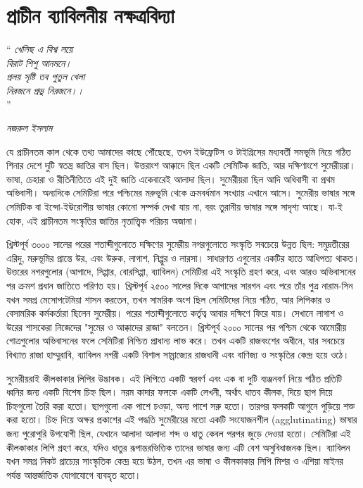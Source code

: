 

\chapter{প্রাচীন ব্যাবিলনীয় নক্ষত্রবিদ্যা}
\epigraph{``\textit{
খেলিছ এ বিশ্ব লয়ে \\
বিরাট শিশু আনমনে। \\
প্রলয় সৃষ্টি তব পুতুল খেলা \\
নিরজনে প্রভু নিরজনে।। \\
}''}{\textit{নজরুল ইসলাম}}

যে প্রাচীনতম কাল থেকে তথ্য আমাদের কাছে পৌঁছেছে, তখন ইউফ্রেটিস ও টাইগ্রিসের মধ্যবর্তী সমভূমি নিয়ে গঠিত শিনার দেশে দুটি স্বতন্ত্র জাতির বাস ছিল। উত্তরাংশ আক্কাদে ছিল একটি সেমিটিক জাতি, আর দক্ষিণাংশে সুমেরীয়রা। ভাষা, চেহারা ও রীতিনীতিতে এই দুই জাতি একেবারেই আলাদা ছিল। সুমেরীয়রা ছিল আদি অধিবাসী বা প্রথম অভিবাসী। অন্যদিকে সেমিটিরা পরে পশ্চিমের মরুভূমি থেকে ক্রমবর্ধমান সংখ্যায় এখানে আসে। সুমেরীয় ভাষার সঙ্গে সেমিটিক বা ইন্দো-ইউরোপীয় ভাষার কোনো সম্পর্ক দেখা যায় না, বরং তুরানীয় ভাষার সঙ্গে সাদৃশ্য আছে। যা-ই হোক, এই প্রাচীনতম সংস্কৃতির জাতির নৃতাত্ত্বিক পরিচয় অজানা।

খ্রিস্টপূর্ব ৩০০০ সালের পরের শতাব্দীগুলোতে দক্ষিণের সুমেরীয় নগরগুলোতে সংস্কৃতি সবচেয়ে উন্নত ছিল: সমুদ্রতীরের এরিদু, মরুভূমির প্রান্তে উর, এবং উরুক, লাগাশ, নিপ্পুর ও লারসা। সাধারণত এগুলোর একটির হাতে আধিপত্য থাকত। উত্তরের নগরগুলোর (আগাদে, সিপ্পার, বোরসিপ্পা, ব্যাবিলন) সেমিটিরা এই সংস্কৃতি গ্রহণ করে, এবং আরও অভিবাসনের পর ক্রমশ প্রধান জাতিতে পরিণত হয়। খ্রিস্টপূর্ব ২৫০০ সালের দিকে আগাদের সারগন এবং পরে তাঁর পুত্র নারাম-সিন যখন সমগ্র মেসোপটেমিয়া শাসন করতেন, তখন সামরিক অংশ ছিল সেমিটিদের নিয়ে গঠিত, আর লিপিকার ও বেসামরিক কর্মকর্তারা ছিলেন সুমেরীয়। পরের শতাব্দীগুলোতে কর্তৃত্ব আবার দক্ষিণে ফিরে যায়। সেখানে লাগাশ ও উরের শাসকেরা নিজেদের "সুমের ও আক্কাদের রাজা" বলতেন। খ্রিস্টপূর্ব ২০০০ সালের পর পশ্চিম থেকে আমোরীয় গোত্রগুলোর অভিবাসনের ফলে সেমিটিরা নিশ্চিত প্রাধান্য লাভ করে। তখন একটি রাজবংশের অধীনে, যার সবচেয়ে বিখ্যাত রাজা হাম্মুরাবি, ব্যাবিলন নগরী একটি বিশাল সাম্রাজ্যের রাজধানী এবং বাণিজ্য ও সংস্কৃতির কেন্দ্র হয়ে ওঠে।

সুমেরীয়রাই কীলকাকার লিপির উদ্ভাবক। এই লিপিতে একটি স্বরবর্ণ এবং এক বা দুটি ব্যঞ্জনবর্ণ নিয়ে গঠিত প্রতিটি ধ্বনির জন্য একটি বিশেষ চিহ্ন ছিল। নরম কাদার ফলকে একটি লেখনী, অর্থাৎ ধাতব কীলক, দিয়ে ছাপ দিয়ে চিহ্নগুলো তৈরি করা হতো। ছাপগুলো এক পাশে চওড়া, অন্য পাশে সরু হতো। তারপর ফলকটি আগুনে পুড়িয়ে শক্ত করা হতো। চিহ্ন দিয়ে অক্ষর প্রকাশের এই পদ্ধতি সুমেরীয়ের মতো একটি সংযোজনশীল (agglutinating) ভাষার জন্য পুরোপুরি উপযোগী ছিল, যেখানে আলাদা আলাদা শব্দ ও ধাতু কেবল পরপর জুড়ে দেওয়া হতো। সেমিটিরা এই কীলকাকার লিপি গ্রহণ করে, যদিও ধাতুর রূপান্তরভিত্তিক তাদের ভাষার জন্য এটি বেশ অসুবিধাজনক ছিল। ব্যাবিলন যখন সমগ্র নিকট প্রাচ্যের সাংস্কৃতিক কেন্দ্র হয়ে উঠল, তখন এর ভাষা ও কীলকাকার লিপি মিশর ও এশিয়া মাইনর পর্যন্ত আন্তর্জাতিক যোগাযোগে ব্যবহৃত হতো।

